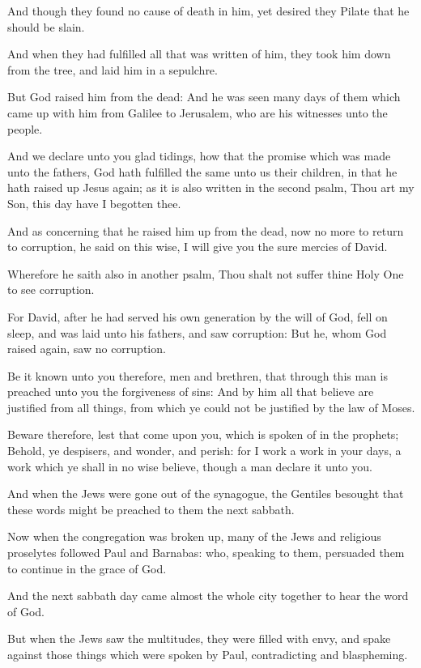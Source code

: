 \Verse And though they found no cause of death in him, yet desired they Pilate that he should be slain.

\Verse And when they had fulfilled all that was written of him, they took him down from the tree, and laid him in a sepulchre.

\Verse But God raised him from the dead: \Verse And he was seen many days of them which came up with him from Galilee to Jerusalem, who are his witnesses unto the people.

\Verse And we declare unto you glad tidings, how that the promise which was made unto the fathers, \Verse God hath fulfilled the same unto us their children, in that he hath raised up Jesus again; as it is also written in the second psalm, Thou art my Son, this day have I begotten thee.

\Verse And as concerning that he raised him up from the dead, now no more to return to corruption, he said on this wise, I will give you the sure mercies of David.

\Verse Wherefore he saith also in another psalm, Thou shalt not suffer thine Holy One to see corruption.

\Verse For David, after he had served his own generation by the will of God, fell on sleep, and was laid unto his fathers, and saw corruption: \Verse But he, whom God raised again, saw no corruption.

\Verse Be it known unto you therefore, men and brethren, that through this man is preached unto you the forgiveness of sins: \Verse And by him all that believe are justified from all things, from which ye could not be justified by the law of Moses.

\Verse Beware therefore, lest that come upon you, which is spoken of in the prophets; \Verse Behold, ye despisers, and wonder, and perish: for I work a work in your days, a work which ye shall in no wise believe, though a man declare it unto you.

\Verse And when the Jews were gone out of the synagogue, the Gentiles besought that these words might be preached to them the next sabbath.

\Verse Now when the congregation was broken up, many of the Jews and religious proselytes followed Paul and Barnabas: who, speaking to them, persuaded them to continue in the grace of God.

\Verse And the next sabbath day came almost the whole city together to hear the word of God.

\Verse But when the Jews saw the multitudes, they were filled with envy, and spake against those things which were spoken by Paul, contradicting and blaspheming.

